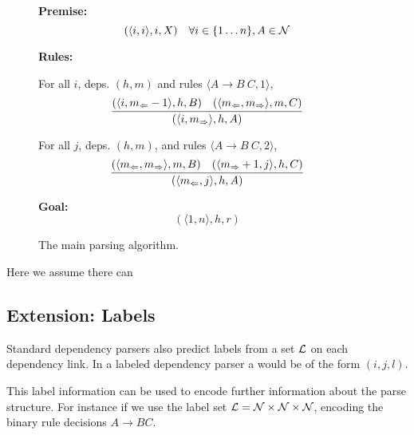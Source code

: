\documentclass[11pt,letterpaper]{article}
\newcommand{\nonterms}{\mathcal{N}}
\newcommand{\Left}[1]{#1_{\Leftarrow}}
\newcommand{\Right}[1]{#1_{\Rightarrow}}
\newcommand{\Span}[1]{\langle #1 \rangle}
\newcommand{\tri}{\Span{\Left{m}, \Right{m}}}
\begin{document}


\begin{figure}
  \noindent \textbf{Premise:}
  \[(\langle i,i \rangle, i, X)\ \ \ \forall i \in \{1 \ldots n\}, A \in {\cal N}\]

  \noindent\textbf{Rules:}



   For all   $i$,  deps. $(h, m)$ and  rules  $\langle A \rightarrow B\ C, 1 \rangle$,
  \[\infer{( \Span{ i, \Right{m} }, h, A)}{(\Span{i, \Left{m}-1}, h, B)  &  (\tri, m, C) } \]

  For all    $j$,  deps. $(h, m)$, and  rules  $\langle A \rightarrow B\ C, 2\rangle$,
  \[ \infer{( \Span{\Left{m}, j}, h, A)}{(\tri, m, B)  &  (\Span{\Right{m}+ 1, j}, h, C) } \]



\noindent \textbf{Goal:}\[ (\Span{1, n}, h, r)\]

\caption{The main parsing algorithm.}
\end{figure}

Here we assume there can


\subsection{Extension: Labels}

Standard dependency parsers also predict labels from a set ${\cal L}$ on each dependency link.
In a labeled dependency parser a would be of the form $(i, j, l)$.

This label information can be used to encode further information about the parse structure. For instance
if we use the label set ${\cal L} = \nonterms \times \nonterms \times \nonterms$, encoding the binary rule decisions $A \rightarrow B C$.
\end{document}

